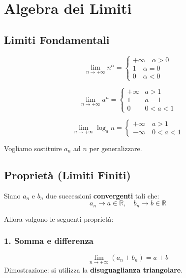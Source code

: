 






\section{Algebra dei Limiti}\label{algebra-de-limiti}

\subsection{Limiti Fondamentali}

\[
\lim_{n \to +\infty} n^{\alpha} = 
\begin{cases}
+\infty \quad \alpha>0\\ 
1 \quad \alpha=0\\ 
0 \quad \alpha<0
\end{cases}
\]

\[
\lim_{n \to +\infty} a^n = 
\begin{cases}
+\infty & a>1\\ 
1 & a=1\\ 
0 & 0<a<1
\end{cases}
\]

\[
\lim_{n \to +\infty} \log_a n = 
\begin{cases}
+\infty \quad a>1\\
-\infty \quad 0<a<1
\end{cases}
\]

Vogliamo sostituire \(a_n\) ad \(n\) per generalizzare.
\subsection{Proprietà (Limiti Finiti)}\label{proprieta-limiti-finiti}

Siano \(a_n\) e \(b_n\) due successioni \textbf{convergenti} tali che:  
\[a_n \to a \in \mathbb{R}, \quad b_n \to b \in \mathbb{R}\]

Allora valgono le seguenti proprietà:
\subsubsection{1. Somma e differenza}
\[
\lim_{n \to +\infty} (a_n \pm b_n) = a \pm b
\]
Dimostrazione: si utilizza la \textbf{disuguaglianza triangolare}.

